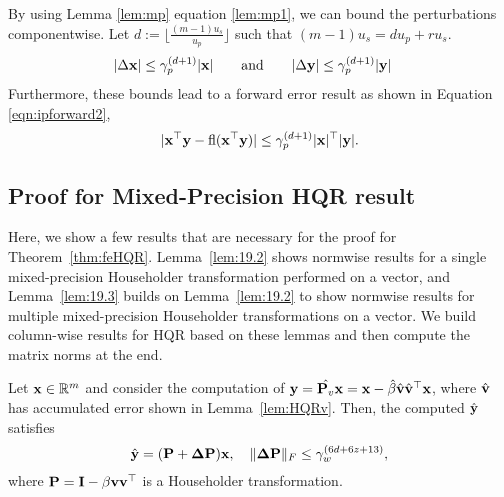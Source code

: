 By using Lemma \ref{lem:mp} equation \ref{lem:mp1}, we can bound the perturbations componentwise.
Let $d:=\lfloor\frac{(m-1)u_s}{u_p}\rfloor$ such that $(m-1)u_s = d u_p + r u_s$. 
\begin{align*}
|\Delta \bb{x}| &\leq \gamma_p^{(d+1)}|\bb{x}| %
\qquad \mbox{and} \qquad
|\Delta \bb{y}| %
\leq \gamma_p^{(d+1)}|\bb{y}| 
\end{align*}
Furthermore, these bounds lead to a forward error result as shown in Equation \ref{eqn:ipforward2},
\begin{equation}
\label{eqn:ipforward2}
|\mathbf{x}^{\top}\mathbf{y}-\mathrm{fl}(\mathbf{x}^{\top}\mathbf{y})| \leq \gamma_p^{(d+1)}|\mathbf{x}|^{\top}|\mathbf{y}|.
\end{equation}

\subsection{Proof for Mixed-Precision HQR result}
\label{Appendix:HQR}
Here, we show a few results that are necessary for the proof for Theorem~\ref{thm:feHQR}.
Lemma~\ref{lem:19.2} shows normwise results for a single mixed-precision Householder transformation performed on a vector, and Lemma~\ref{lem:19.3} builds on Lemma~\ref{lem:19.2} to show normwise results for multiple mixed-precision Householder transformations on a vector. 
We build column-wise results for HQR based on these lemmas and then compute the matrix norms at the end.
\begin{lemma}
	\label{lem:19.2}
	Let $\mathbf{x}\in\mathbb{R}^m$ and consider the computation of $\mathbf{y}=\hat{\mathbf{P}_v}\mathbf{x} = \mathbf{x}-\hat{\beta}\hat{\mathbf{v}}\hat{\mathbf{v}}^{\top}\mathbf{x}$, where $\hat{\mathbf{v}}$ has accumulated error shown in Lemma~\ref{lem:HQRv}.
	Then, the computed $\hat{\mathbf{y}}$ satisfies 
	\begin{equation}
	\hat{\mathbf{y}} = (\mathbf{P}+\mathbf{\Delta P}) \mathbf{x},\quad \|\mathbf{\Delta P}\|_F\leq\gamma_w^{(6d+6z+13)},
	\end{equation}
	where $\mathbf{P} = \mathbf{I}-\beta\mathbf{v}\mathbf{v}^{\top}$ is a Householder transformation.
\end{lemma}

